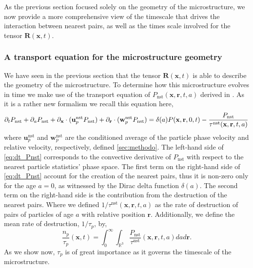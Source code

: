 As the previous section focused solely on the geometry of the microstructure, we now provide a more comprehensive view of the timescale that drives the interaction between nearest pairs, as well as the times scale involved for the tensor $\textbf{R}(\textbf{x},t)$.

\subsubsection*{A transport equation for the microstructure geometry}
We have seen in the previous section that the tensor $\textbf{R}(\textbf{x},t)$ is able to describe the geometry of the microstructure. 
To determine how this microstructure evolves in time we make use of the transport equation of $P_\text{nst}(\textbf{x},\textbf{r},t,a)$ derived in \citet{zhang2023evolution}.
As it is a rather new formalism we recall this equation here, 
\begin{equation}
    \partial_t P_\text{nst}
    + \partial_a P_\text{nst}
    + {\partial_\textbf{x}} \cdot  (\textbf{u}^\text{nst}_p P_\text{nst})
    + {\partial_\textbf{r}} \cdot  (\textbf{w}^\text{nst}_p P_\text{nst})
    = \delta(a)P(\textbf{x},\textbf{r},0,t)
    - \frac{P_\text{nst}}{\tau^\text{nst}(\textbf{x},\textbf{r},t,a)}
    \label{eq:dt_Pnst}
\end{equation}
where $\textbf{u}^\text{nst}_p$ and $\textbf{w}_{p}^\text{nst}$ are the conditioned average of the particle phase velocity and relative velocity, respectively, defined \ref{sec:methodo}. 
The left-hand side of \ref{eq:dt_Pnst} corresponds to the convective derivative of $P_\text{nst}$ with respect to the nearest particle statistics' phase space. 
The first term on the right-hand side of \ref{eq:dt_Pnst} account for the creation of the nearest pairs, thus it is non-zero only for the age $a = 0$, as witnessed by the Dirac delta function $\delta(a)$. 
The second term on the right-hand side is the contribution from the destruction of the nearest pairs.
Where we defined $1/\tau^\text{nst}(\textbf{x},\textbf{r},t,a)$ as the rate of destruction of pairs of particles of age $a$ with relative position $\textbf{r}$.
Additionally, we define the mean rate of destruction, $1/\tau_p$, by, 
\begin{equation*}
    \frac{n_p}{\tau_p}(\textbf{x},t) = 
    \int_{0}^\infty
    \int_{\mathbb{R}^3}
    \frac{P_\text{nst} }{\tau^\text{nst}}(\textbf{x},\textbf{r},t,a)
    da d\textbf{r}. 
\end{equation*}
As we show now, $\tau_p$ is of great importance as it governs the timescale of the microstructure.

